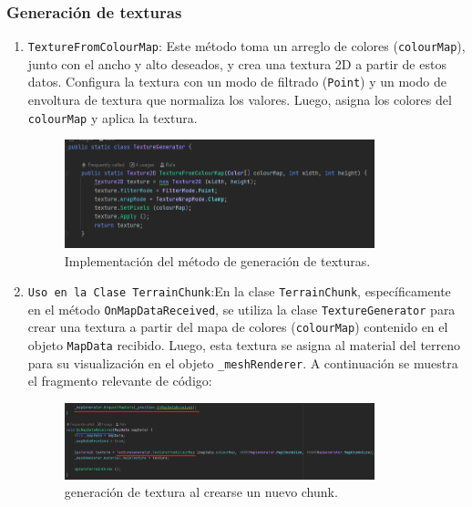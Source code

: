 \subsubsection{Generación de texturas}

\begin{enumerate}
    \item \texttt{TextureFromColourMap}: Este método toma un arreglo de colores (\texttt{colourMap}), junto con el ancho y alto deseados, y crea una textura 2D a partir de estos datos. Configura la textura con un modo de filtrado (\texttt{Point}) y un modo de envoltura de textura que normaliza los valores. Luego, asigna los colores del \texttt{colourMap} y aplica la textura.

    \begin{figure}[h]
    \centering
    \includegraphics[width=0.85\textwidth]{img/codes/TextureColor.png}
    \caption{Implementación del método de generación de texturas.}
    \end{figure}
    \newpage
    \item \texttt{Uso en la Clase TerrainChunk}:En la clase \texttt{TerrainChunk}, específicamente en el método \texttt{OnMapDataReceived}, se utiliza la clase \texttt{TextureGenerator} para crear una textura a partir del mapa de colores (\texttt{colourMap}) contenido en el objeto \texttt{MapData} recibido. Luego, esta textura se asigna al material del terreno para su visualización en el objeto \texttt{\_meshRenderer}. A continuación se muestra el fragmento relevante de código:
    \begin{figure}[h]
        \centering
        \includegraphics[width=0.85\textwidth]{img/codes/TexturizacionDeChunk.png}
        \caption{generación de textura al crearse un nuevo chunk.}
    \end{figure}
    
\end{enumerate}

